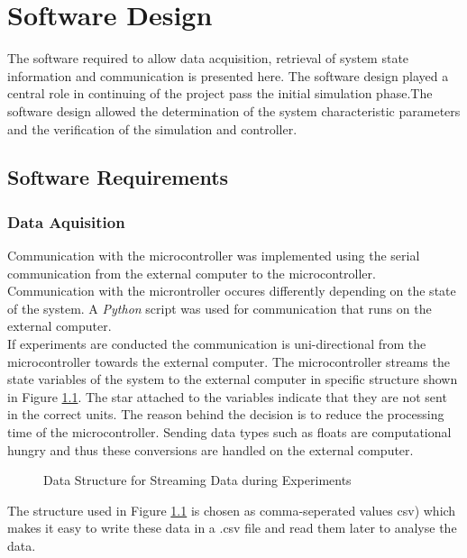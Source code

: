 \chapter{Software Design}
\label{chp5:software}

The software required to allow data acquisition, retrieval of system state information and communication is presented here. The software design played a central role in continuing of the project pass the initial simulation phase.The software design allowed the determination of the system characteristic parameters and the verification of the simulation and controller.

\section{Software Requirements}
\label{sec:software_requirements}

\subsection{Data Aquisition}
Communication with the microcontroller was implemented using the serial communication from the external computer to the microcontroller. Communication with the microntroller occures differently depending on the state of the system. A \textit{Python} script was used for communication that runs on the external computer.\\

If experiments are conducted the communication is uni-directional from the microcontroller towards the external computer. The microcontroller streams the state variables of the system to the external computer in specific structure shown in Figure \ref{fig:data_struct}. The star attached to the variables indicate that they are not sent in the correct units. The reason behind the decision is to reduce the processing time of the microcontroller. Sending data types such as floats are computational hungry and thus these conversions are handled on the external computer.

\begin{figure}[h]
	\centering
	
	\caption{Data Structure for Streaming Data during Experiments}
	\label{fig:data_struct}
\end{figure}

The structure used in Figure \ref{fig:data_struct} is chosen as comma-seperated values csv) which makes it easy to write these data in a .csv file and read them later to analyse the data.\\

